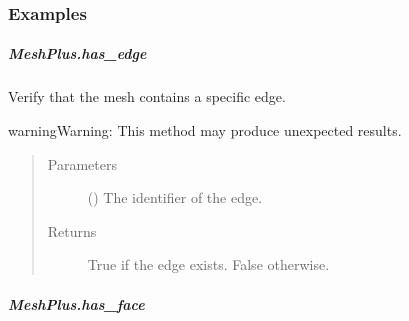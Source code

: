 \documentclass[letterpaper,10pt,english]{sphinxmanual}
\begin{document}
\begin{fulllineitems}
\begin{fulllineitems}
\subsubsection*{Examples}

\begin{sphinxVerbatim}[commandchars=\\\{\}]
\end{sphinxVerbatim}

\end{fulllineitems}



\subparagraph{MeshPlus.has\_edge}
\label{\detokenize{api/generated/directional_clustering.mesh.MeshPlus.has_edge:meshplus-has-edge}}\label{\detokenize{api/generated/directional_clustering.mesh.MeshPlus.has_edge::doc}}

\begin{fulllineitems}
\label{\detokenize{api/generated/directional_clustering.mesh.MeshPlus.has_edge:directional_clustering.mesh.MeshPlus.has_edge}}
Verify that the mesh contains a specific edge.

\begin{sphinxadmonition}{warning}{Warning:}
This method may produce unexpected results.
\end{sphinxadmonition}
\begin{quote}\begin{description}
\item[{Parameters}] \leavevmode
{} () \textendash{} The identifier of the edge.

\item[{Returns}] \leavevmode
{} \textendash{} True if the edge exists.
False otherwise.

\end{description}\end{quote}

\end{fulllineitems}



\subparagraph{MeshPlus.has\_face}
\label{\detokenize{api/generated/directional_clustering.mesh.MeshPlus.has_face:meshplus-has-face}}\label{\detokenize{api/generated/directional_clustering.mesh.MeshPlus.has_face::doc}}


\end{fulllineitems}
\end{document}
